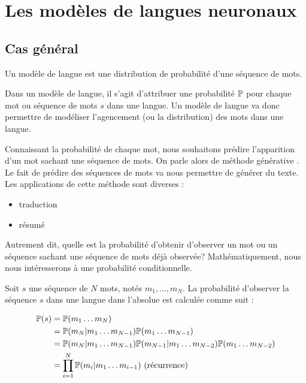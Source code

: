 

\title{}
\author{Etienne Boisseau, Olivier Dulcy, Christos Katsoulakis, Eric Lavergne}
\date{}

\pagestyle{theme}



\tableofcontents

\section{Les modèles de langues neuronaux}

\subsection{Cas général}

\begin{definition}
  Un modèle de langue est une distribution de probabilité d'une séquence de mots.
\end{definition}

Dans un modèle de langue, il s'agit d'attribuer une probabilité $\P$ pour chaque mot ou séquence de mots $s$ dans une langue.
Un modèle de langue va donc permettre de modéliser l'agencement (ou la distribution) des mots dans une langue. 

Connaissant la probabilité de chaque mot, nous souhaitons prédire l'apparition d'un mot sachant une séquence de mots. On parle alors de méthode \og générative \fg{}. Le fait de prédire des séquences de mots va nous permettre de générer du texte.
Les applications de cette méthode sont diverses :
\begin{itemize}
  \item traduction
  \item résumé
\end{itemize}
Autrement dit, quelle est la probabilité d'obtenir d'observer un mot ou un séquence sachant une séquence de mots déjà observée? Mathématiquement, nous nous intéresserons à une probabilité conditionnelle. 

Soit $s$ une séquence de $N$ mots, notés $m_1, \ldots, m_N$. La probabilité d'observer la séquence $s$ dans une langue dans l'absolue est calculée comme suit :

\begin{align*}
  \P(s) &= \P(m_1\ldots m_N) \\
  &= \P(m_N \vert m_1\ldots m_{N-1})\P(m_1\ldots m_{N-1}) \\
  &= \P(m_N \vert m_1\ldots m_{N-1})\P(m_{N-1}\vert m_1\ldots m_{N-2}) \P(m_1 \ldots m_{N-2}) \\ 
  &=\prod_{i=1}^N \P(m_i \vert m_1\ldots m_{i-1}) \text{ (récurrence)}
\end{align*}

